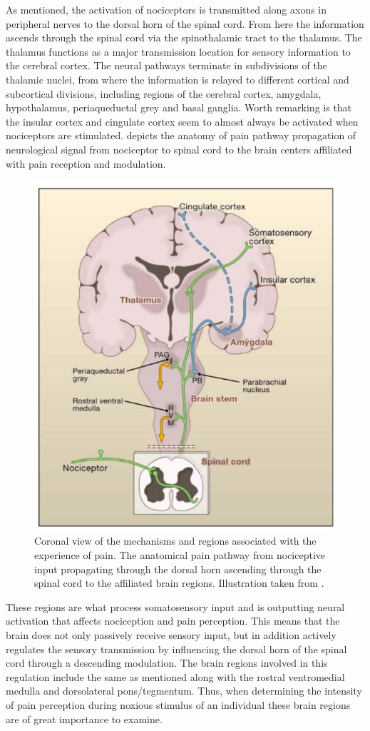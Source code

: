 As mentioned, the activation of nociceptors is transmitted along axons in peripheral nerves to the dorsal horn of the spinal cord. From here the information ascends through the spinal cord via the spinothalamic tract to the thalamus. The thalamus functions as a major transmission location for sensory information to the cerebral cortex. The neural pathways terminate in subdivisions of the thalamic nuclei, from where the information is relayed to different cortical and subcortical divisions, including regions of the cerebral cortex, amygdala, hypothalamus, periaqueductal grey and basal ganglia. Worth remarking is that the insular cortex and cingulate cortex seem to almost always be activated when nociceptors are stimulated. \cite{Davis2017, Tracey2007}  depicts the anatomy of pain pathway propagation of neurological signal from nociceptor to spinal cord to the brain centers affiliated with pain reception and modulation.

\begin{figure}[H]                 
	\includegraphics[width=.47\textwidth]{figures/aBackground/Brain}  
	\caption{Coronal view of the mechanisms and regions associated with the experience of pain. The anatomical pain pathway from nociceptive input propagating through the dorsal horn ascending through the spinal cord to the affiliated brain regions. Illustration taken from \cite{Basbaum2009}.}
	\label{fig:back:brain} 
\end{figure}

These regions are what process somatosensory input and is outputting neural activation that affects nociception and pain perception. \cite{Garland2013} This means that the brain does not only passively receive sensory input, but in addition actively regulates the sensory transmission by influencing the dorsal horn of the spinal cord through a descending modulation. The brain regions involved in this regulation include the same as mentioned along with the rostral ventromedial medulla and dorsolateral pons/tegmentum. \cite{Tracey2007} Thus, when determining the intensity of pain perception during noxious stimulus of an individual these brain regions are of great importance to examine. 
